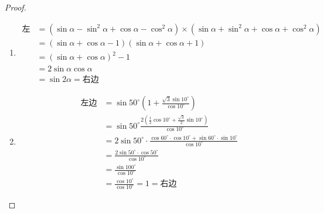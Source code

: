 \begin{proof}
\begin{enumerate}
    \item \[\begin{split}
 \text{左边}&=(\sin\alpha-\sin^2\alpha+\cos\alpha-\cos^2\alpha)\times (\sin\alpha+\sin^2\alpha+\cos\alpha+\cos^2\alpha)\\
 &=(\sin\alpha+\cos\alpha-1)(\sin\alpha+\cos\alpha+1)\\
 &=(\sin\alpha+\cos\alpha)^2-1\\
 &=2\sin\alpha\cos\alpha\\
 &=\sin2\alpha=\text{右边}       
    \end{split}\]
    \item \[\begin{split}
\text{左边}&= \sin 50^{\circ} \left(1+\frac{\sqrt{3}\sin 10^{\circ}}{\cos 10^{\circ}}\right)\\       
&= \sin 50^{\circ}\frac{2\left(\frac{1}{2}\cos10^{\circ}+\frac{\sqrt{3}}{2}\sin 10^{\circ}\right)}{\cos 10^{\circ}}\\
&=2\sin 50^{\circ}\cdot \frac{\cos60^{\circ}\cdot \cos10^{\circ}+\sin 60^{\circ}\cdot \sin 10^{\circ}}{\cos10^{\circ}}\\
&=\frac{2\sin50^{\circ}\cdot \cos50^{\circ}}{\cos10^{\circ}}\\
&=\frac{\sin100^{\circ}}{\cos10^{\circ}}\\
&=\frac{\cos10^{\circ}}{\cos10^{\circ}}=1=\text{右边}
    \end{split}\]
\end{enumerate}    
\end{proof}

